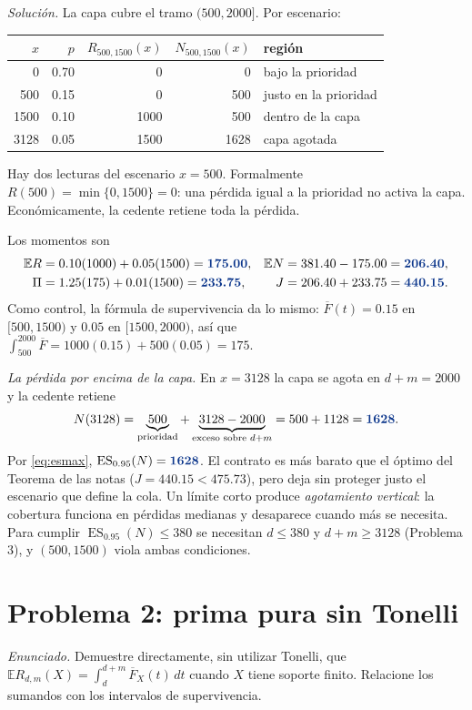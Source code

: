 \documentclass[11pt,reqno]{amsart}
\theoremstyle{definition}\newtheorem{definition}[theorem]{Definición}
\theoremstyle{remark}\newtheorem{remark}[theorem]{Observación}
\DeclareMathOperator{\ES}{ES}
\newcommand{\E}{\mathbb E}
\newcommand{\resultado}[1]{\ensuremath{{\color{resultblue}\boldsymbol{#1}}}}
\begin{document}
\emph{Solución.} La capa cubre el tramo $(500,2000]$. Por escenario:
\begin{center}
\begin{tabular}{rrrrl}
\toprule
$x$ & $p$ & $R_{500,1500}(x)$ & $N_{500,1500}(x)$ & región \\
\midrule
0 & 0.70 & 0 & 0 & bajo la prioridad\\
500 & 0.15 & 0 & 500 & justo en la prioridad\\
1500 & 0.10 & 1000 & 500 & dentro de la capa\\
3128 & 0.05 & 1500 & 1628 & capa agotada\\
\bottomrule
\end{tabular}
\end{center}
Hay dos lecturas del escenario $x=500$. Formalmente $R(500)=\min\{0,1500\}=0$: una pérdida igual a la prioridad no activa la capa. Económicamente, la cedente retiene toda la pérdida.

Los momentos son
\begin{align*}
\E R&=0.10(1000)+0.05(1500)=\resultado{175.00},&
\E N&=381.40-175.00=\resultado{206.40},\\
\Pi&=1.25(175)+0.01(1500)=\resultado{233.75},&
J&=206.40+233.75=\resultado{440.15}.
\end{align*}
Como control, la fórmula de supervivencia da lo mismo: $\overline F(t)=0.15$ en $[500,1500)$ y $0.05$ en $[1500,2000)$, así que $\int_{500}^{2000}\overline F=1000(0.15)+500(0.05)=175$.

\emph{La pérdida por encima de la capa.} En $x=3128$ la capa se agota en $d+m=2000$ y la cedente retiene
\[
N(3128)=\underbrace{500}_{\text{prioridad}}+\underbrace{3128-2000}_{\text{exceso sobre }d+m}=500+1128=\resultado{1628}.
\]
Por \eqref{eq:esmax}, $\ES_{0.95}(N)=\resultado{1628}$. El contrato es más barato que el óptimo del Teorema de las notas ($J=440.15<475.73$), pero deja sin proteger justo el escenario que define la cola. Un límite corto produce \emph{agotamiento vertical}: la cobertura funciona en pérdidas medianas y desaparece cuando más se necesita. Para cumplir $\ES_{0.95}(N)\le380$ se necesitan $d\le380$ y $d+m\ge3128$ (Problema 3), y $(500,1500)$ viola ambas condiciones.

\section{Problema 2: prima pura sin Tonelli}
\emph{Enunciado.} Demuestre directamente, sin utilizar Tonelli, que $\E R_{d,m}(X)=\int_d^{d+m}\overline F_X(t)\,dt$ cuando $X$ tiene soporte finito. Relacione los sumandos con los intervalos de supervivencia.
\end{document}
